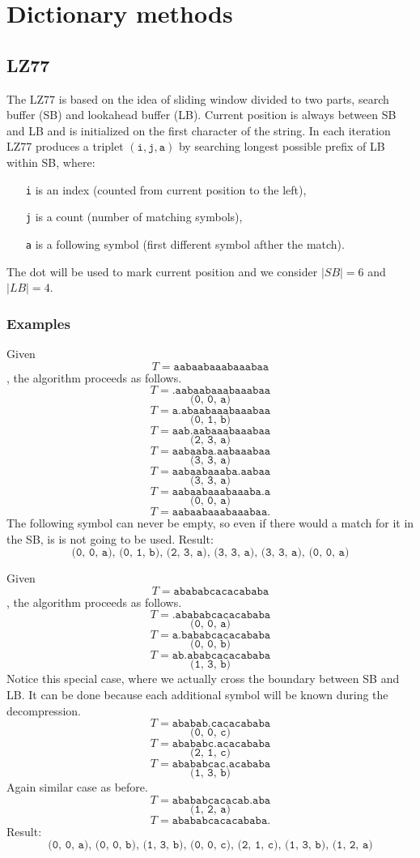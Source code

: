 \chapter{Dictionary methods}

\section{LZ77}

The LZ77 is based on the idea of sliding window divided to two parts, search buffer (SB) and lookahead buffer (LB).
Current position is always between SB and LB and is initialized on the first character of the string. In each iteration LZ77 produces a triplet $(\texttt{i}, \texttt{j}, \texttt{a})$ by searching longest possible prefix of LB within SB, where:
\begin{itemize}
  \item[\texttt{i}] is an index (counted from current position to the left),
  \item[\texttt{j}] is a count (number of matching symbols),
  \item[\texttt{a}] is a following symbol (first different symbol afther the match).
\end{itemize}
The dot will be used to mark current position and we consider $|SB|=6$ and $|LB|=4$.

\subsection{Examples}

Given
$$T = \texttt{aabaabaaabaaabaa}$$,
the algorithm proceeds as follows.
$$T = \texttt{.aabaabaaabaaabaa}$$
$$ \texttt{(0, 0, a)} $$
$$T = \texttt{a.abaabaaabaaabaa}$$
$$ \texttt{(0, 1, b)} $$
$$T = \texttt{aab.aabaaabaaabaa}$$
$$ \texttt{(2, 3, a)} $$
$$T = \texttt{aabaaba.aabaaabaa}$$
$$ \texttt{(3, 3, a)} $$
$$T = \texttt{aabaabaaaba.aabaa}$$
$$ \texttt{(3, 3, a)} $$
$$T = \texttt{aabaabaaabaaaba.a}$$
$$ \texttt{(0, 0, a)} $$
$$T = \texttt{aabaabaaabaaabaa.}$$
The following symbol can never be empty, so even if there would a match for it in the SB, is is not going to be used.
Result: $$ \texttt{(0, 0, a), (0, 1, b), (2, 3, a), (3, 3, a), (3, 3, a), (0, 0, a)} $$

Given
$$T = \texttt{abababcacacababa}$$,
the algorithm proceeds as follows.
$$T = \texttt{.abababcacacababa}$$
$$ \texttt{(0, 0, a)} $$
$$T = \texttt{a.bababcacacababa}$$
$$ \texttt{(0, 0, b)} $$
$$T = \texttt{ab.ababcacacababa}$$
$$ \texttt{(1, 3, b)} $$
Notice this special case, where we actually cross the boundary between SB and LB. It can be done because each additional symbol will be known during the decompression.
$$T = \texttt{ababab.cacacababa}$$
$$ \texttt{(0, 0, c)} $$
$$T = \texttt{abababc.acacababa}$$
$$ \texttt{(2, 1, c)} $$
$$T = \texttt{abababcac.acababa}$$
$$ \texttt{(1, 3, b)} $$
Again similar case as before.
$$T = \texttt{abababcacacab.aba}$$
$$ \texttt{(1, 2, a)} $$
$$T = \texttt{abababcacacababa.}$$
Result: $$ \texttt{(0, 0, a), (0, 0, b), (1, 3, b), (0, 0, c), (2, 1, c), (1, 3, b), (1, 2, a)} $$

